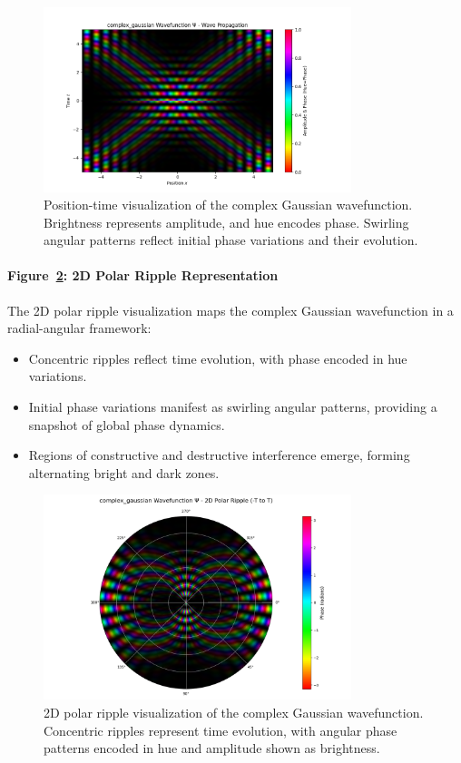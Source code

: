 \documentclass[12pt]{article}
\begin{document}
\begin{figure}[H]
    \centering
    \includegraphics[width=0.8\textwidth]{images/complex_gaussian_wavefunction_probability_density_with_phase.png}
    \caption{Position-time visualization of the complex Gaussian wavefunction. Brightness represents amplitude, and hue encodes phase. Swirling angular patterns reflect initial phase variations and their evolution.}
    \label{fig:complex_gaussian_xt}
\end{figure}

\paragraph{Figure~\ref{fig:complex_gaussian_2d_polar}: 2D Polar Ripple Representation}
The 2D polar ripple visualization maps the complex Gaussian wavefunction in a radial-angular framework:
\begin{itemize}
    \item Concentric ripples reflect time evolution, with phase encoded in hue variations.
    \item Initial phase variations manifest as swirling angular patterns, providing a snapshot of global phase dynamics.
    \item Regions of constructive and destructive interference emerge, forming alternating bright and dark zones.
\end{itemize}

\begin{figure}[H]
\centering
\includegraphics[width=0.8\textwidth]{images/complex_gaussian_wavefunction_2d_polar_probability_density_with_phase.png}
\caption{2D polar ripple visualization of the complex Gaussian wavefunction. Concentric ripples represent time evolution, with angular phase patterns encoded in hue and amplitude shown as brightness.}
\label{fig:complex_gaussian_2d_polar}
\end{figure}
\end{document}
